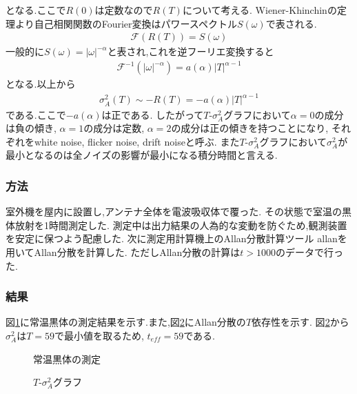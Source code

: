 となる.ここで$R(0)$は定数なので$R(T)$について考える.
Wiener-Khinchinの定理より自己相関関数のFourier変換はパワースペクトル$S(\omega)$で表される.\cite{ishikawa40:online}
\begin{align}
  \mathcal{F}(R(T))=S(\omega)
\end{align}
一般的に$S(\omega)=|\omega|^{-\alpha}$と表され,これを逆フーリエ変換すると
\begin{align}
  \mathcal{F}^{-1}(|\omega|^{-\alpha})=a(\alpha)|T|^{\alpha-1}
\end{align}
となる.以上から
\begin{align}
  \sigma_A^2(T)\sim -R(T)=-a(\alpha)|T|^{\alpha-1}
\end{align}
である.ここで$-a(\alpha)$は正である.
したがって$T$-$\sigma_A^2$グラフにおいて$\alpha=0$の成分は負の傾き,
$\alpha=1$の成分は定数, $\alpha=2$の成分は正の傾きを持つことになり,
それぞれをwhite noise, flicker noise, drift noiseと呼ぶ.
また$T$-$\sigma_A^2$グラフにおいて$\sigma_A^2$が最小となるのは全ノイズの影響が最小になる積分時間と言える.
\subsubsection{方法}
室外機を屋内に設置し,アンテナ全体を電波吸収体で覆った.
その状態で室温の黒体放射を1時間測定した.
測定中は出力結果の人為的な変動を防ぐため,観測装置を安定に保つよう配慮した.
次に測定用計算機上のAllan分散計算ツール allanを用いてAllan分散を計算した.
ただしAllan分散の計算は$t>1000$のデータで行った.
\subsubsection{結果}
図\ref{fig:allan_raw}に常温黒体の測定結果を示す.また,図\ref{fig:allan}にAllan分散の$T$依存性を示す.
図\ref{fig:allan}から$\sigma_A^2$は$T=59$で最小値を取るため, $t_{eff}=59$である.
\begin{figure}[hptb]
\begin{center}

\caption{常温黒体の測定}
\label{fig:allan_raw}
\end{center}
\end{figure}
\begin{figure}[hptb]
\begin{center}

\caption{$T$-$\sigma_A^2$グラフ}
\label{fig:allan}
\end{center}
\end{figure}